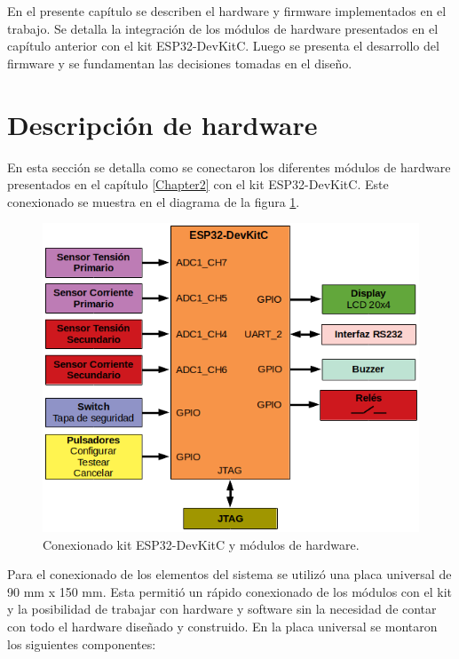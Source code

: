 
En el presente capítulo se describen el hardware y firmware implementados en el trabajo. Se detalla la integración de los módulos de hardware presentados en el capítulo anterior con el kit ESP32-DevKitC. Luego se presenta el desarrollo del firmware y se fundamentan las decisiones tomadas en el diseño.

\section{Descripción de hardware}
En esta sección se detalla como se conectaron los diferentes módulos de hardware presentados en el capítulo \ref{Chapter2} con el kit ESP32-DevKitC. Este conexionado se muestra en el diagrama de la figura \ref{fig:conexionado}.

\begin{figure}[htpb]
	\centering
	\includegraphics[scale=0.7]{./Figures/diagrama_det.png}
	\caption{Conexionado kit ESP32-DevKitC y módulos de hardware.}
	\label{fig:conexionado}
\end{figure}

Para el conexionado de los elementos del sistema se utilizó una placa universal de 90 mm x 150 mm. Esta permitió un rápido conexionado de los módulos con el kit y la posibilidad de trabajar con hardware y software sin la necesidad de contar con todo el hardware diseñado y construido. En la placa universal se montaron los siguientes componentes:


